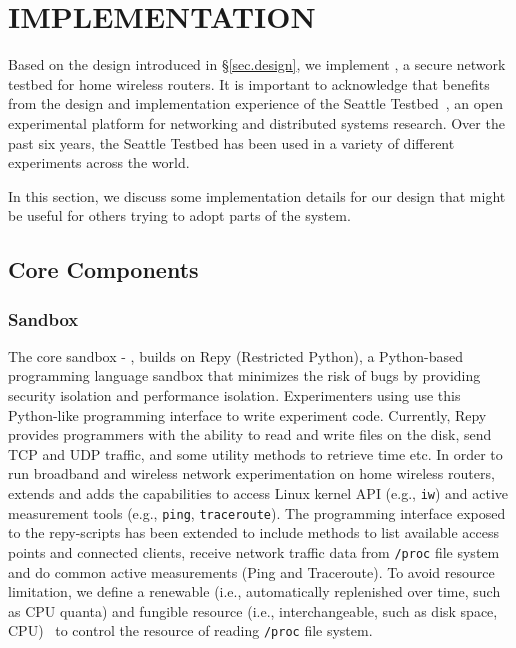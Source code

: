 \chapter{IMPLEMENTATION} 
\label{sec.implementation}
Based on the design introduced in \S{\ref{sec.design}}, we implement \sysname, a secure network testbed for home wireless routers. It is important to acknowledge that \sysname benefits from the design and implementation experience of the Seattle Testbed~\cite{cappos2009seattle}, an open experimental platform for networking and distributed systems research. Over the past six years, the Seattle Testbed has been used in a variety of different experiments across the world. 

In this section, we discuss some implementation details for our design that might be useful for others trying to adopt parts of the system.

\section{Core Components}
\subsection{Sandbox}
\label{sec.sandbox}
The core sandbox - \sandboxname, builds on Repy (Restricted Python), a Python-based programming language sandbox that minimizes the risk of bugs by providing security isolation and performance isolation. Experimenters using \sysname use this Python-like programming interface to write experiment code. Currently, Repy provides programmers with the ability to read and write files on the disk, send TCP and UDP traffic, and some utility methods to retrieve time etc. In order to run broadband and wireless network experimentation on home wireless routers, \sysname extends and adds the capabilities to access Linux kernel API (e.g., \texttt{iw}) and active measurement tools (e.g., \texttt{ping}, \texttt{traceroute}). The programming interface exposed to the repy-scripts has been extended to include methods to list available access points and connected clients, receive network traffic data from \texttt{/proc} file system and do common active measurements (Ping and Traceroute). To avoid resource limitation, we define a renewable (i.e., automatically replenished over
time, such as CPU quanta) and fungible resource (i.e., interchangeable, such as disk space, CPU)~\cite{li2015fence} to control the resource of reading \texttt{/proc} file system. 

